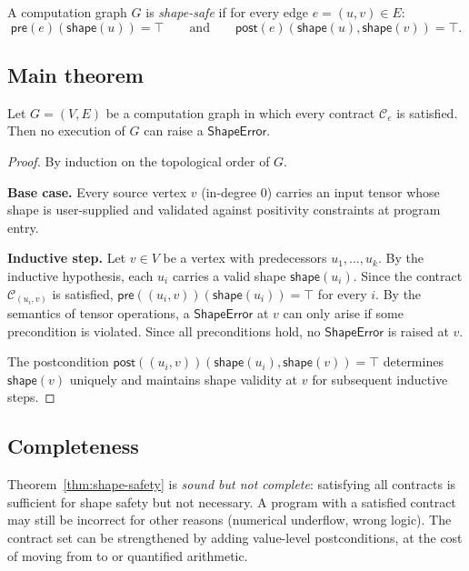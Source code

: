 \documentclass[11pt]{article}
\newcommand{\TShape}[1]{\mathsf{shape}(#1)}       %
\newcommand{\TContract}{\mathcal{C}}               %
\newcommand{\TPre}[1]{\mathsf{pre}(#1)}            %
\newcommand{\TPost}[1]{\mathsf{post}(#1)}          %
\newcommand{\ShapeErr}{\ensuremath{\mathsf{ShapeError}}}        %
\begin{document}
\begin{definition}
A computation graph $G$ is \emph{shape-safe} if for every edge
$e = (u,v) \in E$:
\[
  \TPre{e}(\TShape{u}) = \top
  \qquad\text{and}\qquad
  \TPost{e}(\TShape{u}, \TShape{v}) = \top.
\]
\end{definition}

\subsection{Main theorem}

\begin{theorem}
\label{thm:shape-safety}
Let $G = (V, E)$ be a computation graph in which every contract
$\TContract_e$ is satisfied.  Then no execution of $G$ can raise a
$\ShapeErr$.
\end{theorem}

\begin{proof}
By induction on the topological order of $G$.

\textbf{Base case.}  Every source vertex $v$ (in-degree 0) carries an
input tensor whose shape is user-supplied and validated against
positivity constraints at program entry.

\textbf{Inductive step.}  Let $v \in V$ be a vertex with predecessors
$u_1, \ldots, u_k$.  By the inductive hypothesis, each $u_i$ carries a
valid shape $\TShape{u_i}$.  Since the contract $\TContract_{(u_i,v)}$
is satisfied, $\TPre{(u_i,v)}(\TShape{u_i}) = \top$ for every $i$.
By the semantics of tensor operations, a $\ShapeErr$ at $v$ can only
arise if some precondition is violated.  Since all preconditions hold,
no $\ShapeErr$ is raised at $v$.

The postcondition $\TPost{(u_i,v)}(\TShape{u_i}, \TShape{v}) = \top$
determines $\TShape{v}$ uniquely and maintains shape validity at $v$
for subsequent inductive steps.
\end{proof}

\subsection{Completeness}

\begin{remark}[Completeness]
Theorem~\ref{thm:shape-safety} is \emph{sound but not complete}:
satisfying all contracts is sufficient for shape safety but not
necessary.  A program with a satisfied contract may still be
incorrect for other reasons (\eg numerical underflow, wrong logic).
The contract set can be strengthened by adding value-level
postconditions, at the cost of moving from \QFLIA{} to \QFLRA{}
or quantified arithmetic.
\end{remark}
\end{document}
